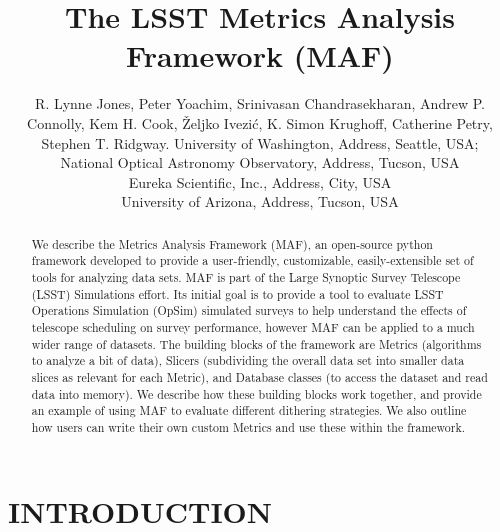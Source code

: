 \documentclass[]{spie}  %
\title{The LSST Metrics Analysis Framework (MAF)}
\author{R. Lynne Jones\supit{a}, Peter Yoachim\supit{a}, Srinivasan
  Chandrasekharan\supit{b}, Andrew P. Connolly\supit{a}, Kem
  H. Cook\supit{c}, {\v Z}eljko Ivezi{\'c}\supit{a},  K. Simon Krughoff\supit{a}, Catherine Petry\supit{d}, Stephen T. Ridgway\supit{b}.
\skiplinehalf
\supit{a}University of Washington, Address, Seattle, USA; \\
\supit{b}National Optical Astronomy Observatory, Address, Tucson, USA\\
\supit{c}Eureka Scientific, Inc., Address, City, USA\\
\supit{d}University of Arizona, Address, Tucson, USA\\
}
\begin{document}
 

  \maketitle 

\lstset{
language=Python,
showstringspaces=false,
formfeed=newpage,
tabsize=4,
basicstyle=\ttfamily\scriptsize,
commentstyle=\itshape,
breaklines=true
}


\begin{abstract}
We describe the Metrics Analysis Framework (MAF), an open-source
python framework developed to provide a user-friendly, customizable,
easily-extensible set of tools for analyzing data sets. MAF is part of
the Large Synoptic Survey Telescope (LSST) Simulations effort. Its
initial goal is to provide a tool to evaluate LSST Operations
Simulation (OpSim) simulated surveys to help understand the effects of
telescope scheduling on survey performance, however MAF can be applied
to a much wider range of datasets. The building blocks of the
framework are Metrics (algorithms to analyze a bit of data), Slicers
(subdividing the overall data set into smaller data slices as relevant
for each Metric), and Database classes (to access the dataset and read
data into memory). We describe how these building blocks work
together, and provide an example of using MAF to evaluate different
dithering strategies. We also outline how users can write their own
custom Metrics and use these within the framework. 
\end{abstract}


\section{INTRODUCTION}
\label{sec:intro}  
\end{document}
